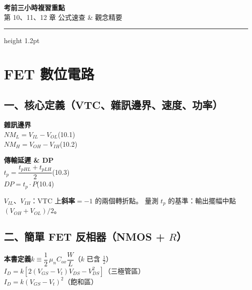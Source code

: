\documentclass[10pt]{article}
\begin{document}
\begin{center}
{\Huge\bfseries\color{maincol} 考前三小時複習重點}\\[0.3em]
{\large\color{keycol} 第 10、11、12 章 \quad 公式速查 \& 觀念精要}
\end{center}
\vspace{0.3em}\hrule height 1.2pt\vspace{0.8em}

\section*{\color{maincol} \quad FET 數位電路}

\subsection*{一、核心定義（VTC、雜訊邊界、速度、功率）}

\begin{formulabox}
\begin{minipage}[t]{0.48\linewidth}
\textbf{雜訊邊界}\\[2pt]
$NM_L = V_{IL} - V_{OL}$\hfill(10.1)\\
$NM_H = V_{OH} - V_{IH}$\hfill(10.2)
\end{minipage}\hfill\vrule\hfill
\begin{minipage}[t]{0.48\linewidth}
\textbf{傳輸延遲 \& DP}\\[2pt]
$t_p = \dfrac{t_{pHL}+t_{pLH}}{2}$\hfill(10.3)\\[4pt]
$DP = t_p \cdot P$\hfill(10.4)
\end{minipage}
\end{formulabox}

\smallskip
$V_{IL}$、$V_{IH}$：VTC 上\textbf{斜率$=-1$} 的兩個轉折點。
量測 $t_p$ 的基準：輸出擺幅中點 $(V_{OH}+V_{OL})/2$。

\subsection*{二、簡單 FET 反相器（NMOS + $R$）}

\begin{formulabox}
\textbf{本書定義}\quad $k \equiv \dfrac{1}{2}\,\mu_n C_{ox}\dfrac{W}{L}$\quad（$k$ 已含 $\tfrac{1}{2}$）\\[6pt]
$I_D = k\!\left[2(V_{GS}-V_t)V_{DS} - V_{DS}^2\right]$\quad（三極管區）\\[4pt]
$I_D = k(V_{GS}-V_t)^2$\quad（飽和區）
\end{formulabox}
\end{document}
